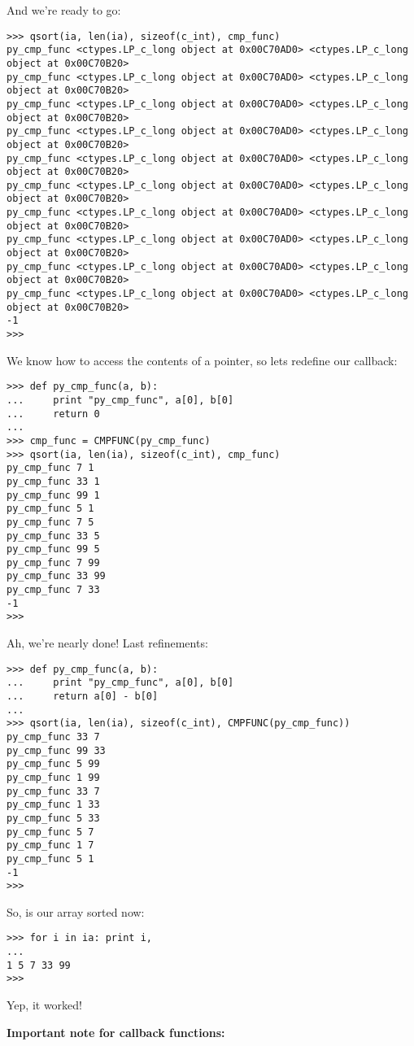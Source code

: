 And we're ready to go:
\begin{verbatim}
>>> qsort(ia, len(ia), sizeof(c_int), cmp_func)
py_cmp_func <ctypes.LP_c_long object at 0x00C70AD0> <ctypes.LP_c_long object at 0x00C70B20>
py_cmp_func <ctypes.LP_c_long object at 0x00C70AD0> <ctypes.LP_c_long object at 0x00C70B20>
py_cmp_func <ctypes.LP_c_long object at 0x00C70AD0> <ctypes.LP_c_long object at 0x00C70B20>
py_cmp_func <ctypes.LP_c_long object at 0x00C70AD0> <ctypes.LP_c_long object at 0x00C70B20>
py_cmp_func <ctypes.LP_c_long object at 0x00C70AD0> <ctypes.LP_c_long object at 0x00C70B20>
py_cmp_func <ctypes.LP_c_long object at 0x00C70AD0> <ctypes.LP_c_long object at 0x00C70B20>
py_cmp_func <ctypes.LP_c_long object at 0x00C70AD0> <ctypes.LP_c_long object at 0x00C70B20>
py_cmp_func <ctypes.LP_c_long object at 0x00C70AD0> <ctypes.LP_c_long object at 0x00C70B20>
py_cmp_func <ctypes.LP_c_long object at 0x00C70AD0> <ctypes.LP_c_long object at 0x00C70B20>
py_cmp_func <ctypes.LP_c_long object at 0x00C70AD0> <ctypes.LP_c_long object at 0x00C70B20>
-1
>>>
\end{verbatim}

We know how to access the contents of a pointer, so lets redefine our callback:
\begin{verbatim}
>>> def py_cmp_func(a, b):
...     print "py_cmp_func", a[0], b[0]
...     return 0
...
>>> cmp_func = CMPFUNC(py_cmp_func)
>>> qsort(ia, len(ia), sizeof(c_int), cmp_func)
py_cmp_func 7 1
py_cmp_func 33 1
py_cmp_func 99 1
py_cmp_func 5 1
py_cmp_func 7 5
py_cmp_func 33 5
py_cmp_func 99 5
py_cmp_func 7 99
py_cmp_func 33 99
py_cmp_func 7 33
-1
>>>
\end{verbatim}

Ah, we're nearly done! Last refinements:
\begin{verbatim}
>>> def py_cmp_func(a, b):
...     print "py_cmp_func", a[0], b[0]
...     return a[0] - b[0]
...
>>> qsort(ia, len(ia), sizeof(c_int), CMPFUNC(py_cmp_func))
py_cmp_func 33 7
py_cmp_func 99 33
py_cmp_func 5 99
py_cmp_func 1 99
py_cmp_func 33 7
py_cmp_func 1 33
py_cmp_func 5 33
py_cmp_func 5 7
py_cmp_func 1 7
py_cmp_func 5 1
-1
>>>
\end{verbatim}

So, is our array sorted now:
\begin{verbatim}
>>> for i in ia: print i,
...
1 5 7 33 99
>>>
\end{verbatim}

Yep, it worked!

\textbf{Important note for callback functions:}

